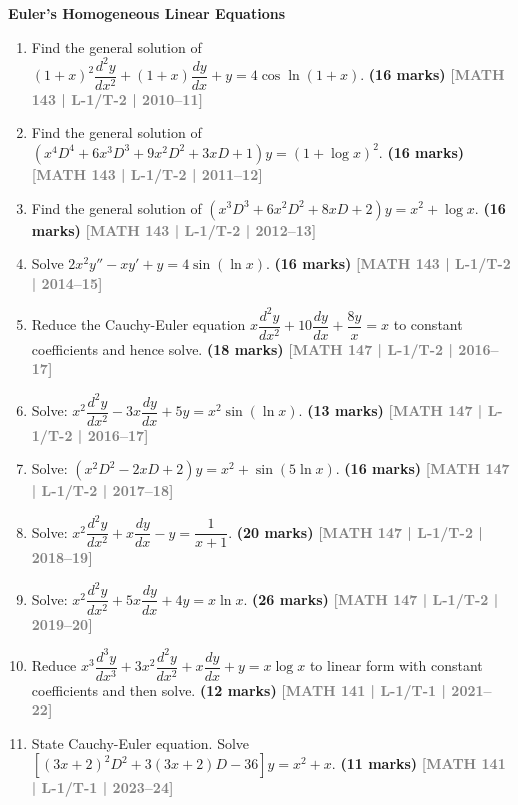 \documentclass[12pt,a4paper]{article}
\newcommand{\yr}[1]{\hfill\textcolor{gray}{\small\textbf{[#1]}}}
\newcommand{\mk}[1]{\textcolor{orange!70!black}{\small\textbf{(#1 marks)}}}
\newcommand{\subtopic}[2]{%
  \vspace{10pt}
  \noindent\begin{tcolorbox}[colback=#1!8,colframe=#1,boxrule=0.6pt,arc=4pt,
    left=6pt,right=6pt,top=4pt,bottom=4pt]
    \small\bfseries\textcolor{#1}{#2}
  \end{tcolorbox}
  \vspace{2pt}
}
\begin{document}
\subtopic{cC}{Euler's Homogeneous Linear Equations}
\label{sub:s3-euler}

\begin{enumerate}

\item Find the general solution of $(1+x)^{2}\dfrac{d^{2}y}{dx^{2}}+(1+x)\dfrac{dy}{dx}+y=4\cos\ln(1+x)$.
\mk{16\textonehalf} \yr{MATH 143 | L-1/T-2 | 2010--11}

\item Find the general solution of $(x^{4}D^{4}+6x^{3}D^{3}+9x^{2}D^{2}+3xD+1)y=(1+\log x)^{2}$.
\mk{16} \yr{MATH 143 | L-1/T-2 | 2011--12}

\item Find the general solution of $(x^{3}D^{3}+6x^{2}D^{2}+8xD+2)y=x^{2}+\log x$.
\mk{16} \yr{MATH 143 | L-1/T-2 | 2012--13}

\item Solve $2x^{2}y''-xy'+y=4\sin(\ln x)$.
\mk{16} \yr{MATH 143 | L-1/T-2 | 2014--15}

\item Reduce the Cauchy-Euler equation $x\dfrac{d^{2}y}{dx^{2}}+10\dfrac{dy}{dx}+\dfrac{8y}{x}=x$ to constant coefficients and hence solve.
\mk{18} \yr{MATH 147 | L-1/T-2 | 2016--17}

\item Solve: $x^{2}\dfrac{d^{2}y}{dx^{2}}-3x\dfrac{dy}{dx}+5y=x^{2}\sin(\ln x)$.
\mk{13} \yr{MATH 147 | L-1/T-2 | 2016--17}

\item Solve: $(x^{2}D^{2}-2xD+2)y=x^{2}+\sin(5\ln x)$.
\mk{16} \yr{MATH 147 | L-1/T-2 | 2017--18}

\item Solve: $x^{2}\dfrac{d^{2}y}{dx^{2}}+x\dfrac{dy}{dx}-y=\dfrac{1}{x+1}$.
\mk{20} \yr{MATH 147 | L-1/T-2 | 2018--19}

\item Solve: $x^{2}\dfrac{d^{2}y}{dx^{2}}+5x\dfrac{dy}{dx}+4y=x\ln x$.
\mk{26} \yr{MATH 147 | L-1/T-2 | 2019--20}

\item Reduce $x^{3}\dfrac{d^{3}y}{dx^{3}}+3x^{2}\dfrac{d^{2}y}{dx^{2}}+x\dfrac{dy}{dx}+y=x\log x$ to linear form with constant coefficients and then solve.
\mk{12} \yr{MATH 141 | L-1/T-1 | 2021--22}

\item State Cauchy-Euler equation. Solve $[(3x+2)^{2}D^{2}+3(3x+2)D-36]y=x^{2}+x$.
\mk{11} \yr{MATH 141 | L-1/T-1 | 2023--24}


\end{enumerate}
\end{document}
